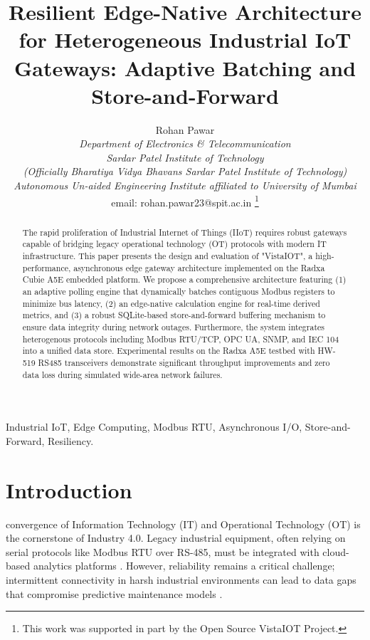 \documentclass[journal]{IEEEtran}
\begin{document}
\title{Resilient Edge-Native Architecture for Heterogeneous Industrial IoT Gateways: Adaptive Batching and Store-and-Forward}

\author{Rohan Pawar \\
\textit{Department of Electronics \& Telecommunication} \\
\textit{Sardar Patel Institute of Technology} \\
\textit{(Officially Bharatiya Vidya Bhavans Sardar Patel Institute of Technology)} \\
\textit{Autonomous Un-aided Engineering Institute affiliated to University of Mumbai} \\
email: rohan.pawar23@spit.ac.in
\thanks{This work was supported in part by the Open Source VistaIOT Project.}}

\maketitle

\begin{abstract}
The rapid proliferation of Industrial Internet of Things (IIoT) requires robust gateways capable of bridging legacy operational technology (OT) protocols with modern IT infrastructure. This paper presents the design and evaluation of "VistaIOT", a high-performance, asynchronous edge gateway architecture implemented on the Radxa Cubie A5E embedded platform. We propose a comprehensive architecture featuring (1) an adaptive polling engine that dynamically batches contiguous Modbus registers to minimize bus latency, (2) an edge-native calculation engine for real-time derived metrics, and (3) a robust SQLite-based store-and-forward buffering mechanism to ensure data integrity during network outages. Furthermore, the system integrates heterogenous protocols including Modbus RTU/TCP, OPC UA, SNMP, and IEC 104 into a unified data store. Experimental results on the Radxa A5E testbed with HW-519 RS485 transceivers demonstrate significant throughput improvements and zero data loss during simulated wide-area network failures.
\end{abstract}

\begin{IEEEkeywords}
Industrial IoT, Edge Computing, Modbus RTU, Asynchronous I/O, Store-and-Forward, Resiliency.
\end{IEEEkeywords}

\section{Introduction}
 convergence of Information Technology (IT) and Operational Technology (OT) is the cornerstone of Industry 4.0. Legacy industrial equipment, often relying on serial protocols like Modbus RTU over RS-485, must be integrated with cloud-based analytics platforms \cite{sbc_industry}. However, reliability remains a critical challenge; intermittent connectivity in harsh industrial environments can lead to data gaps that compromise predictive maintenance models \cite{edge_computing}.
\end{document}
